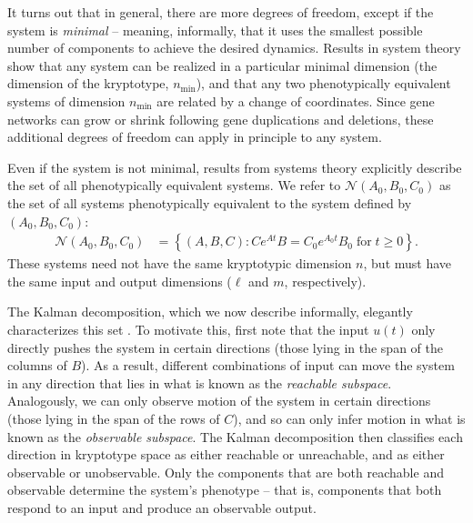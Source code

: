 \documentclass{article}
\newcommand{\1}{\mathbbm{1}}
\newcommand{\Sys}{\mathcal{S}}
\newcommand{\allS}{\mathcal{N}}
\begin{document}
It turns out that in general, there are more degrees of freedom,
except if the system is \emph{minimal} -- meaning, informally, that it uses the smallest possible number of components
to achieve the desired dynamics.
Results in system theory show that any system can be realized in a particular minimal dimension
(the dimension of the kryptotype, $n_\text{min}$),
and that any two phenotypically equivalent systems of dimension $n_\text{min}$ are related by a change of coordinates.
Since gene networks can grow or shrink following gene duplications and deletions, 
these additional degrees of freedom can apply in principle to any system.

Even if the system is not minimal, results from systems theory %
explicitly describe the set of all phenotypically equivalent systems.
We refer to $\allS(A_0,B_0,C_0)$ as the set of all systems phenotypically equivalent
to the system defined by $(A_0, B_0, C_0)$:
\begin{equation} \label{eqn:equivalence}
  \begin{aligned}
    \allS(A_0, B_0, C_0) 
      &= \left\{
        (A,B,C) : C e^{At} B = C_0 e^{A_0 t} B_0 \; \text{for}\; t \ge 0 
      \right\}  .
  \end{aligned}
\end{equation}
These systems need not have the same kryptotypic dimension $n$,
but must have the same input and output dimensions ($\ell$ and $m$, respectively).

The Kalman decomposition, which we now describe informally, elegantly characterizes this set
\citep{kalman1963mathematical,kalman1969topics,anderson1966equivalence}.
To motivate this, first note that the input $u(t)$ only directly pushes the system
in certain directions (those lying in the span of the columns of $B$).
As a result, different combinations of input can 
move the system in any direction that lies in what is known as the \emph{reachable subspace}.
Analogously, we can only observe motion of the system in certain directions
(those lying in the span of the rows of $C$),
and so can only infer motion in what is known as the \emph{observable subspace}.
The Kalman decomposition then classifies each direction in kryptotype space
as either reachable or unreachable, and as either observable or unobservable.
Only the components that are both reachable and observable determine the system's phenotype --
that is, components that both respond to an input and produce an observable output. 
\end{document}

